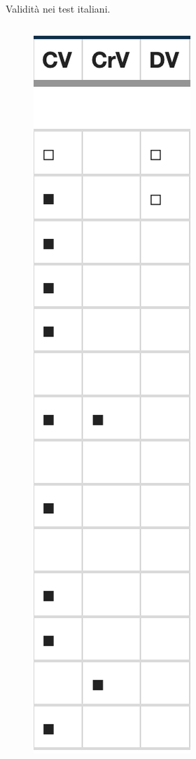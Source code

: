 \documentclass[
  ignorenonframetext,
]{beamer}
\begin{document}
\begin{frame}{Validità nei test italiani.}
\label{validituxe0-nei-test-italiani.}
\begin{columns}

\vspace{2em}

\begin{figure}
\includegraphics[scale=0.4]{Figures/Aiello_table.png}
\end{figure}


\end{columns}
\end{frame}
\end{document}
